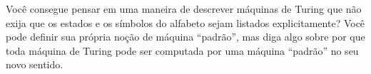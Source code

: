 \documentclass[../../../include/open-logic-section]{subfiles}
\begin{document}
\begin{prob}
  Você consegue pensar em uma maneira de descrever máquinas de Turing
  que não exija que os estados e os símbolos do alfabeto sejam
  listados explicitamente? Você pode definir sua própria noção de
  máquina ``padrão'', mas diga algo sobre por que toda máquina de
  Turing pode ser computada por uma máquina ``padrão'' no seu novo
  sentido.
\end{prob}
\end{document}
